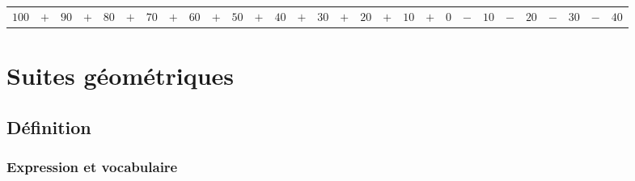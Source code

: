 {\begin{tabular}{rllllllllllllllllllllllllllll}
$100$ & \hspace*{-.3cm} $+$ & \hspace*{-.3cm} $90$  & \hspace*{-.3cm} $+$ & \hspace*{-.3cm} $80$ & \hspace*{-.3cm} $+$ & \hspace*{-.3cm} $70$ & \hspace*{-.3cm} $+$ & \hspace*{-.3cm} $60$ & \hspace*{-.3cm} $+$ & \hspace*{-.3cm} $50$ & \hspace*{-.3cm} $+$ & \hspace*{-.3cm} $40$ & \hspace*{-.3cm} $+$ & \hspace*{-.3cm} $30$ & \hspace*{-.3cm} $+$ & \hspace*{-.3cm} $20$ & \hspace*{-.3cm} $+$ & \hspace*{-.3cm} $10$ & \hspace*{-.3cm} $+$ & \hspace*{-.3cm} $0$ & \hspace*{-.3cm} $-$ & \hspace*{-.3cm} $10$ & \hspace*{-.3cm} $-$ & \hspace*{-.3cm} $20$ & \hspace*{-.3cm} $-$ & \hspace*{-.3cm} $30$ & \hspace*{-.3cm} $-$ & \hspace*{-.3cm} $40$ \\
\end{tabular}}

\newpage

\newpage

\section{Suites géométriques}

\subsection{Définition}

\subsubsection{Expression et vocabulaire}


